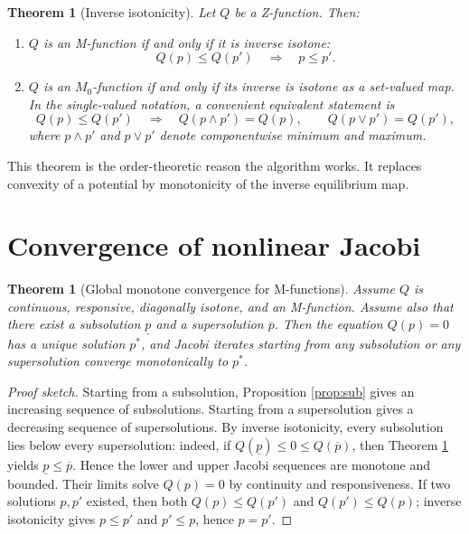 \documentclass[11pt]{article}
\theoremstyle{definition}
\theoremstyle{plain}
\newtheorem{theorem}[definition]{Theorem}
\begin{document}
\begin{theorem}[Inverse isotonicity]\label{thm:inverse}
Let $Q$ be a Z-function. Then:
\begin{enumerate}[label=(\roman*)]
\item $Q$ is an M-function if and only if it is inverse isotone:
\[
        Q(p)\leq Q(p')\quad\Longrightarrow\quad p\leq p'.
\]
\item $Q$ is an $M_0$-function if and only if its inverse is isotone as a set-valued map. In the single-valued notation, a convenient equivalent statement is
\[
        Q(p)\leq Q(p')
        \quad\Longrightarrow\quad
        Q(p\wedge p')=Q(p),\qquad Q(p\vee p')=Q(p'),
\]
where $p\wedge p'$ and $p\vee p'$ denote componentwise minimum and maximum.
\end{enumerate}
\end{theorem}

This theorem is the order-theoretic reason the algorithm works. It replaces convexity of a potential by monotonicity of the inverse equilibrium map.

\section{Convergence of nonlinear Jacobi}

\begin{theorem}[Global monotone convergence for M-functions]\label{thm:Mconv}
Assume $Q$ is continuous, responsive, diagonally isotone, and an M-function. Assume also that there exist a subsolution $\underline p$ and a supersolution $\overline p$. Then the equation $Q(p)=0$ has a unique solution $p^*$, and Jacobi iterates starting from any subsolution or any supersolution converge monotonically to $p^*$.
\end{theorem}

\begin{proof}[Proof sketch]
Starting from a subsolution, Proposition \ref{prop:sub} gives an increasing sequence of subsolutions. Starting from a supersolution gives a decreasing sequence of supersolutions. By inverse isotonicity, every subsolution lies below every supersolution: indeed, if $Q(\underline p)\leq0\leq Q(\overline p)$, then Theorem \ref{thm:inverse} yields $\underline p\leq\overline p$. Hence the lower and upper Jacobi sequences are monotone and bounded. Their limits solve $Q(p)=0$ by continuity and responsiveness. If two solutions $p,p'$ existed, then both $Q(p)\leq Q(p')$ and $Q(p')\leq Q(p)$; inverse isotonicity gives $p\leq p'$ and $p'\leq p$, hence $p=p'$.
\end{proof}
\end{document}
